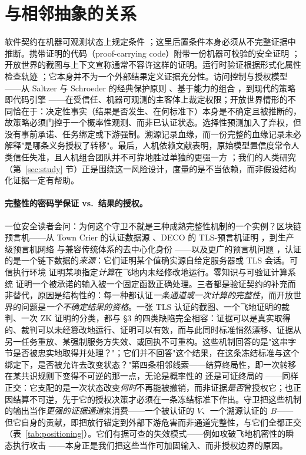 \documentclass[11pt]{ctexart}
\begin{document}
\section{与相邻抽象的关系}
软件契约在机器可观测状态上规定条件 \cite{meyer1997object}；这里后置条件本身必须从不完整证据中推断。携带证明的代码（proof-carrying code）附带一份机器可校验的安全证明 \cite{necula1997proof}；开放世界的截图与上下文宣称通常不容许这样的证明。运行时验证根据形式化属性检查轨迹 \cite{leucker2009brief}；它本身并不为一个外部结果定义证据充分性。访问控制与授权模型——从 Saltzer 与 Schroeder 的经典保护原则 \cite{saltzer1975protection}、基于能力的组合 \cite{miller2006capability}，到现代的策略即代码引擎 \cite{opa2023}——在受信任、机器可观测的主客体上裁定权限；开放世界情形的不同恰在于：决定性事实（结果是否发生、在何标准下）本身是不确定且被推断的，故策略必须门控于一个概率性观测、而非已认证状态。选择性预测加入了弃权，但没有事前承诺、任务绑定或下游强制。溯源记录血缘，而一份完整的血缘记录未必解释"是哪条义务授权了转移"。最后，人机依赖文献表明，原始模型置信度常令人类信任失准，且人机组合团队并不可靠地胜过单独的更强一方 \cite{schemmer2023reliance,vaccaro2024combinations}；我们的人类研究（第~\ref{sec:study} 节）正是围绕这一风险设计，度量的是不当依赖，而非假设结构化证据一定有帮助。

\paragraph{完整性的密码学保证 vs.\ 结果的授权。} 一位安全读者会问：为何这个守卫不就是三种成熟完整性机制的一个实例？区块链预言机——从 Town Crier 的认证数据源 \cite{zhang2016towncrier}、DECO 的 TLS-预言机证明 \cite{zhang2020deco}，到生产级预言机网络 \cite{ellis2017chainlink} 与兼容传统体系的去中心化身份 \cite{maram2021candid}——以及更广的预言机问题 \cite{caldarelli2020oracle}，认证的是一个链下数据的\emph{来源}：它们证明某个值确实源自给定服务器或 TLS 会话。可信执行环境 \cite{costan2016sgx,intel2021tdx,sabt2015tee} 证明某项指定\emph{计算}在飞地内未经修改地运行。零知识与可验证计算系统 \cite{goldwasser1989knowledge,parno2013pinocchio,ben2014succinct,thaler2022proofs} 证明一个被承诺的输入被一个固定函数正确处理。三者都是验证契约的补充而非替代，原因是结构性的：每一种都认证\emph{一条通道或一次计算的完整性}，而开放世界的问题是\emph{一个不确定结果的资格}。一张 TLS 认证的截图、一个飞地证明的裁判、一次 ZK 证明的分类，都与 \S3 的四类缺陷完全相容：证据可以是真实取得的、裁判可以未经篡改地运行、证明可以有效，而与此同时标准悄然漂移、证据从另一任务重放、某强制服务方失效、或回执不可重构。这些机制回答的是"这串字节是否被忠实地取得并处理？"；它们并不回答"这个结果，在这条冻结标准与这个绑定下，是否被允许去改变状态？"第四条相邻线索——结算终局性，即一次转移在某共识规则下变得不可逆的那一点，无论是概率性的 \cite{nakamoto2008bitcoin,garay2015backbone} 还是可证终局的 \cite{buterin2020gasper,buchman2016tendermint}——同样正交：它支配的是一次状态改变\emph{何时}不再能被撤销，而非证据\emph{是否}曾授权它；也正因结算不可逆，先于它的授权决策才必须在一条冻结标准下作出。守卫把这些机制的输出当作\emph{更强的证据通道}来消费——一个被认证的 $V$、一个溯源认证的 $B$——但它自身的贡献，即把放行锚定到外部下游危害而非通道完整性，与它们全都正交（表~\ref{tab:positioning}）。它们有据可查的失效模式——例如攻破飞地机密性的瞬态执行攻击 \cite{vanbulck2018foreshadow}——本身正是我们把这些当作可加固输入、而非授权边界的原因。
\end{document}
